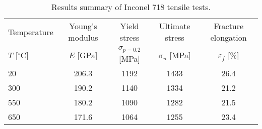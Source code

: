 \begin{table}[htbp]
  \centering
  \caption{Results summary of Inconel 718 tensile tests.}
    \begin{tabular}{lcccc}
    \toprule
    Temperature         & Young's modulus   & Yield stress            & Ultimate stress     & Fracture elongation\\
    $T$ [$^{\circ}$C]   & $E$ [GPa]         & $\sigma_{p=0.2}$ [MPa]  & $\sigma_u$ [MPa]    & $\varepsilon_f$ [\%]\\
    \midrule
    20    & 206.3 & 1192 & 1433 & 26.4 \\
    300   & 190.2 & 1140 & 1334 & 21.2 \\
    550   & 180.2 & 1090 & 1282 & 21.5 \\
    650   & 171.6 & 1064 & 1255 & 23.4 \\
    \bottomrule
    \end{tabular}%
  \label{tab:General_material_mechanical_properties}%
\end{table}%

%
%
%

